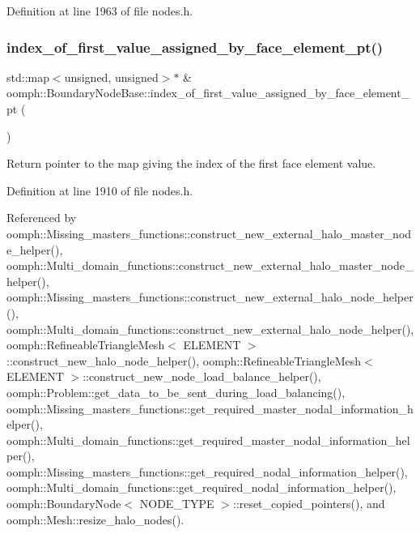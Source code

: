 Definition at line 1963 of file nodes.\+h.

\mbox{\label{classoomph_1_1BoundaryNodeBase_a2f5dc814c83956b5af7342bbfcca0ef0}} 
\subsubsection{\texorpdfstring{index\+\_\+of\+\_\+first\+\_\+value\+\_\+assigned\+\_\+by\+\_\+face\+\_\+element\+\_\+pt()}{index\_of\_first\_value\_assigned\_by\_face\_element\_pt()}}
{\footnotesize\ttfamily std\+::map$<$unsigned, unsigned$>$$\ast$ \& oomph\+::\+Boundary\+Node\+Base\+::index\+\_\+of\+\_\+first\+\_\+value\+\_\+assigned\+\_\+by\+\_\+face\+\_\+element\+\_\+pt (\begin{DoxyParamCaption}{ }\end{DoxyParamCaption})\hspace{0.3cm}{\ttfamily [inline]}}



Return pointer to the map giving the index of the first face element value. 



Definition at line 1910 of file nodes.\+h.



Referenced by oomph\+::\+Missing\+\_\+masters\+\_\+functions\+::construct\+\_\+new\+\_\+external\+\_\+halo\+\_\+master\+\_\+node\+\_\+helper(), oomph\+::\+Multi\+\_\+domain\+\_\+functions\+::construct\+\_\+new\+\_\+external\+\_\+halo\+\_\+master\+\_\+node\+\_\+helper(), oomph\+::\+Missing\+\_\+masters\+\_\+functions\+::construct\+\_\+new\+\_\+external\+\_\+halo\+\_\+node\+\_\+helper(), oomph\+::\+Multi\+\_\+domain\+\_\+functions\+::construct\+\_\+new\+\_\+external\+\_\+halo\+\_\+node\+\_\+helper(), oomph\+::\+Refineable\+Triangle\+Mesh$<$ E\+L\+E\+M\+E\+N\+T $>$\+::construct\+\_\+new\+\_\+halo\+\_\+node\+\_\+helper(), oomph\+::\+Refineable\+Triangle\+Mesh$<$ E\+L\+E\+M\+E\+N\+T $>$\+::construct\+\_\+new\+\_\+node\+\_\+load\+\_\+balance\+\_\+helper(), oomph\+::\+Problem\+::get\+\_\+data\+\_\+to\+\_\+be\+\_\+sent\+\_\+during\+\_\+load\+\_\+balancing(), oomph\+::\+Missing\+\_\+masters\+\_\+functions\+::get\+\_\+required\+\_\+master\+\_\+nodal\+\_\+information\+\_\+helper(), oomph\+::\+Multi\+\_\+domain\+\_\+functions\+::get\+\_\+required\+\_\+master\+\_\+nodal\+\_\+information\+\_\+helper(), oomph\+::\+Missing\+\_\+masters\+\_\+functions\+::get\+\_\+required\+\_\+nodal\+\_\+information\+\_\+helper(), oomph\+::\+Multi\+\_\+domain\+\_\+functions\+::get\+\_\+required\+\_\+nodal\+\_\+information\+\_\+helper(), oomph\+::\+Boundary\+Node$<$ N\+O\+D\+E\+\_\+\+T\+Y\+P\+E $>$\+::reset\+\_\+copied\+\_\+pointers(), and oomph\+::\+Mesh\+::resize\+\_\+halo\+\_\+nodes().

